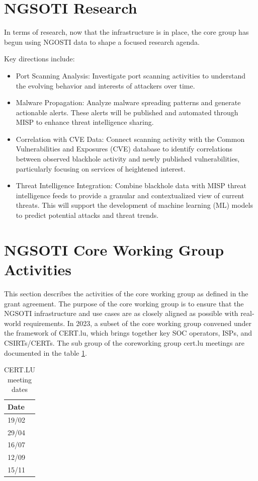 \section{NGSOTI Research}
In terms of research, now that the infrastructure is in place, the core group
has begun using NGOSTI data to shape a focused research agenda.

Key directions include:

\begin{itemize}
 \item Port Scanning Analysis: Investigate port scanning activities to
 understand the evolving behavior and interests of attackers over time.
 \item Malware Propagation: Analyze malware spreading patterns and
 generate actionable alerts. These alerts will be published and automated
 through MISP to enhance threat intelligence sharing.
 \item Correlation with CVE Data: Connect scanning activity with the
 Common Vulnerabilities and Exposures (CVE) database to identify
 correlations between observed blackhole activity and newly published
 vulnerabilities, particularly focusing on services of heightened interest.
 \item Threat Intelligence Integration: Combine blackhole data with MISP
 threat intelligence feeds to provide a granular and contextualized view
 of current threats. This will support the development of machine
 learning (ML) models to predict potential attacks and threat trends.
 \end{itemize}


\section{NGSOTI Core Working Group Activities}
This section describes the activities of the core working group as defined in the grant agreement. The purpose of the core working group is to ensure that the NGSOTI infrastructure and use cases are as closely aligned as possible with real-world requirements. In 2023, a subset of the core working group convened under the framework of CERT.lu, which brings together key SOC operators, ISPs, and CSIRTs/CERTs.
The sub group of the coreworking group cert.lu meetings are documented in the table \ref{certlu}.

\begin{table}[H]
    \centering
    \begin{tabular}{l}
    Date\\
    \hline
    19/02\\
    29/04\\
    16/07\\
    12/09\\
    15/11\\
    \end{tabular}
    \caption{CERT.LU meeting dates}
    \label{certlu}
\end{table}

